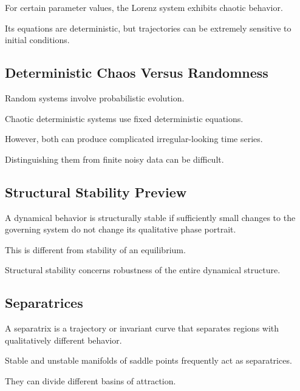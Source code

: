 For certain parameter values, the Lorenz system exhibits chaotic
behavior.

Its equations are deterministic, but trajectories can be extremely
sensitive to initial conditions.

\subsection{Deterministic Chaos Versus Randomness}
\label{subsec:chaos-versus-randomness}

Random systems involve probabilistic evolution.

Chaotic deterministic systems use fixed deterministic equations.

However, both can produce complicated irregular-looking time series.

Distinguishing them from finite noisy data can be difficult.

\subsection{Structural Stability Preview}
\label{subsec:structural-stability-preview}

A dynamical behavior is structurally stable if sufficiently small changes
to the governing system do not change its qualitative phase portrait.

This is different from stability of an equilibrium.

Structural stability concerns robustness of the entire dynamical
structure.

\subsection{Separatrices}
\label{subsec:separatrices}

A separatrix is a trajectory or invariant curve that separates regions
with qualitatively different behavior.

Stable and unstable manifolds of saddle points frequently act as
separatrices.

They can divide different basins of attraction.

